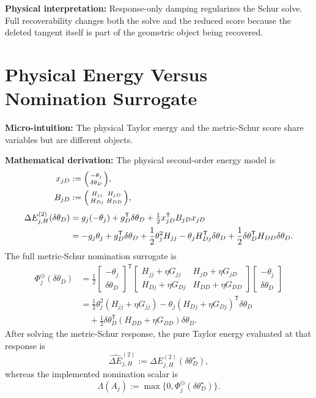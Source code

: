 \documentclass[10pt,twocolumn]{article}
\newcommand{\blocktitle}[1]{\vspace{2pt}\noindent\textbf{#1}\space}
\newcommand{\micro}[1]{\blocktitle{Micro-intuition:} #1}
\newcommand{\deriv}{\blocktitle{Mathematical derivation:}}
\newcommand{\phys}[1]{\blocktitle{Physical interpretation:} #1}
\begin{document}
\phys{Response-only damping regularizes the Schur solve. Full recoverability changes both the solve and the reduced score because the deleted tangent itself is part of the geometric object being recovered.}

\section*{Physical Energy Versus Nomination Surrogate}

\micro{The physical Taylor energy and the metric-Schur score share variables but are different objects.}

\deriv
The physical second-order energy model is
{\scriptsize
\setlength{\arraycolsep}{1pt}
\[
\begin{aligned}
x_{jD}
&:=
\begin{psmallmatrix}
-\theta_j\\
\delta\theta_D
\end{psmallmatrix},
\\
B_{jD}
&:=
\begin{psmallmatrix}
H_{jj} & H_{jD}\\
H_{Dj} & H_{DD}
\end{psmallmatrix},
\\[1mm]
\Delta E_{j,H}^{(2)}(\delta\theta_D)
&=
g_j(-\theta_j)
+
g_D^{\mathsf T}\delta\theta_D
+
\tfrac12 x_{jD}^{\mathsf T}B_{jD}x_{jD}
\\
&=
-g_j\theta_j
+
g_D^{\mathsf T}\delta\theta_D
+
\frac12\theta_j^2H_{jj}
-
\theta_jH_{Dj}^{\mathsf T}\delta\theta_D
+
\frac12\delta\theta_D^{\mathsf T}H_{DD}\delta\theta_D .
\end{aligned}
\]
}
The full metric-Schur nomination surrogate is
{\small
\[
\begin{aligned}
\Phi_j^\ominus(\delta\theta_D)
&=
\frac12
\begin{bmatrix}
-\theta_j\\
\delta\theta_D
\end{bmatrix}^{\mathsf T}
\begin{bmatrix}
H_{jj}+\eta G_{jj} & H_{jD}+\eta G_{jD}\\
H_{Dj}+\eta G_{Dj} & H_{DD}+\eta G_{DD}
\end{bmatrix}
\begin{bmatrix}
-\theta_j\\
\delta\theta_D
\end{bmatrix}
\\
&=
\frac12\theta_j^2(H_{jj}+\eta G_{jj})
-
\theta_j(H_{Dj}+\eta G_{Dj})^{\mathsf T}\delta\theta_D
\\
&\quad
+
\frac12
\delta\theta_D^{\mathsf T}
(H_{DD}+\eta G_{DD})
\delta\theta_D .
\end{aligned}
\]
}
After solving the metric-Schur response, the pure Taylor energy evaluated at that response is
\[
\widehat{\Delta E}_{j,H}^{(2)}
:=
\Delta E_{j,H}^{(2)}(\delta\theta_D^\star),
\]
whereas the implemented nomination scalar is
\[
\Lambda(A_j)
:=
\max\{0,\Phi_j^\ominus(\delta\theta_D^\star)\}.
\]
\end{document}
